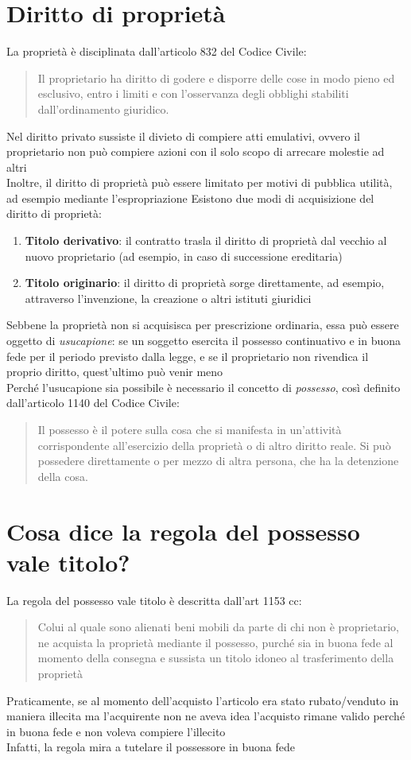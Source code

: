 \documentclass[10pt,oneside,a4paper]{article}
\begin{document}
	\section{Diritto di proprietà}
	La proprietà è disciplinata dall'articolo 832 del Codice Civile:
	\begin{quote}
		Il proprietario ha diritto di godere e disporre delle cose in modo pieno ed esclusivo, entro i limiti e con l'osservanza degli obblighi stabiliti dall'ordinamento giuridico.
	\end{quote}
	Nel diritto privato sussiste il divieto di compiere atti emulativi, ovvero il proprietario non può compiere azioni con il solo scopo di arrecare molestie ad altri\\
	Inoltre, il diritto di proprietà può essere limitato per motivi di pubblica utilità, ad esempio mediante l'espropriazione
	Esistono due modi di acquisizione del diritto di proprietà:
	\begin{enumerate}
		\item \textbf{Titolo derivativo}: il contratto trasla il diritto di proprietà dal vecchio al nuovo proprietario (ad esempio, in caso di successione ereditaria)
		\item \textbf{Titolo originario}: il diritto di proprietà sorge direttamente, ad esempio, attraverso l'invenzione, la creazione o altri istituti giuridici
	\end{enumerate}
	Sebbene la proprietà non si acquisisca per prescrizione ordinaria, essa può essere oggetto di \textit{usucapione}: se un soggetto esercita il possesso continuativo e in buona fede per il periodo previsto dalla legge, e se il proprietario non rivendica il proprio diritto, quest'ultimo può venir meno\\
	Perché l'usucapione sia possibile è necessario il concetto di \textit{possesso}, così definito dall'articolo 1140 del Codice Civile:
	\begin{quote}
		Il possesso è il potere sulla cosa che si manifesta in un'attività corrispondente all'esercizio della proprietà o di altro diritto reale. Si può possedere direttamente o per mezzo di altra persona, che ha la detenzione della cosa.
	\end{quote}
	\section{Cosa dice la regola del possesso vale titolo?}
	La regola del possesso vale titolo è descritta dall'art 1153 cc:
	\begin{quote}
		Colui al quale sono alienati beni mobili da parte di chi non è proprietario, ne acquista la proprietà mediante il possesso, purché sia in buona fede al momento della consegna e sussista un titolo idoneo al trasferimento della proprietà
	\end{quote}
	Praticamente, se al momento dell'acquisto l'articolo era stato rubato/venduto in maniera illecita ma l'acquirente non ne aveva idea l'acquisto rimane valido perché in buona fede e non voleva compiere l'illecito\\
	Infatti, la regola mira a tutelare il possessore in buona fede
\end{document}
